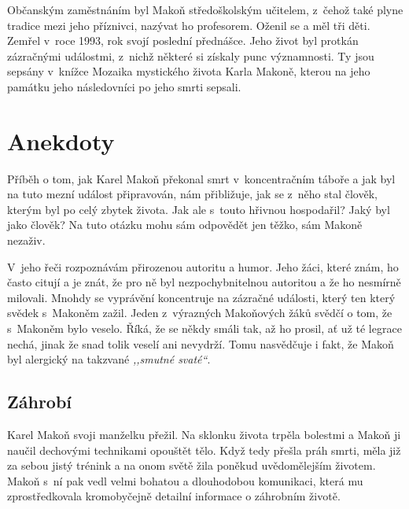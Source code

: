 Občanským zaměstnáním byl Makoň středoškolským učitelem, z~čehož také plyne
tradice mezi jeho příznivci, nazývat ho profesorem. Oženil se a měl tři děti.
Zemřel v~roce 1993, rok svojí poslední přednášce. Jeho život byl protkán
zázračnými událostmi, z~nichž některé si získaly punc významnosti. Ty jsou
sepsány v~knížce Mozaika mystického života Karla Makoně\cite{mozaika}, kterou na
jeho památku jeho následovníci po jeho smrti sepsali.

\section{Anekdoty}

Příběh o tom, jak Karel Makoň překonal smrt v~koncentračním táboře a jak byl na
tuto mezní událost připravován, nám přibližuje, jak se z~něho stal člověk,
kterým byl po celý zbytek života. Jak ale s~touto hřivnou hospodařil? Jaký byl
jako člověk? Na tuto otázku mohu sám odpovědět jen těžko, sám Makoně nezaživ.

V~jeho řeči rozpoznávám přirozenou autoritu a humor. Jeho žáci, které znám, ho
často citují a je znát, že pro ně byl nezpochybnitelnou autoritou a že ho
nesmírně milovali. Mnohdy se vyprávění koncentruje na zázračné události, který
ten který svědek s~Makoněm zažil. Jeden z~výrazných Makoňových žáků svědčí o
tom, že s~Makoněm bylo veselo. Říká, že se někdy smáli tak, až ho prosil, ať už
té legrace nechá, jinak že snad tolik veselí ani nevydrží. Tomu nasvědčuje i
fakt, že Makoň byl alergický na takzvané \textit{,,smutné svaté``}.

\subsection{Záhrobí}

Karel Makoň svoji manželku přežil. Na sklonku života trpěla bolestmi a Makoň ji
naučil dechovými technikami opouštět tělo. Když tedy přešla práh smrti, měla již
za sebou jistý trénink a na onom světě žila poněkud uvědomělejším životem. Makoň
s~ní pak vedl velmi bohatou a dlouhodobou komunikaci, která mu zprostředkovala
kromobyčejně detailní informace o záhrobním životě.

